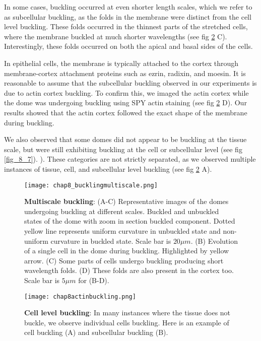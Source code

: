 In some cases, buckling occurred at even shorter length scales, which we refer to as subcellular buckling, as the folds in the membrane were distinct from the cell level buckling. These folds occurred in the thinnest parts of the stretched cells, where the membrane buckled at much shorter wavelengths (see fig \ref{fig_8_6} C). Interestingly, these folds occurred on both the apical and basal sides of the cells.

In epithelial cells, the membrane is typically attached to the cortex through membrane-cortex attachment proteins such as ezrin, radixin, and moesin. It is reasonable to assume that the subcellular buckling observed in our experiments is due to actin cortex buckling. To confirm this, we imaged the actin cortex while the dome was undergoing buckling using SPY actin staining (see fig \ref{fig_8_6} D). Our results showed that the actin cortex followed the exact shape of the membrane during buckling.

We also observed that some domes did not appear to be buckling at the tissue scale, but were still exhibiting buckling at the cell or subcellular level (see fig \ref{fig_8_7}). ). These categories are not strictly separated, as we observed multiple instances of tissue, cell, and subcellular level buckling  (see fig \ref{fig_8_6} A).

\begin{figure}
	\centering
	\texttt{[image: chap8\_bucklingmultiscale.png]}
	\caption{\label{fig_8_4} \textbf{Multiscale buckling}: (A-C) Representative images of the domes undergoing buckling at different scales. Buckled and unbuckled states of the dome with zoom in section buckled component. Dotted yellow line represents uniform curvature in unbuckled state and non-uniform curvature in buckled state. Scale bar is $20 \mu m$. (B) Evolution of a single cell in the dome during buckling. Highlighted by yellow arrow. (C) Some parts of cells undergo buckling producing short wavelength folds. (D) These  folds are also present in the cortex too. Scale bar is $5 \mu m$ for (B-D).
	}
\end{figure}

\begin{figure}[]
	\centering
	\texttt{[image: chap8actinbuckling.png]}
	\caption{\label{fig_8_6} \textbf{Cell level buckling}: In many instances where the tissue does not buckle, we observe individual cells buckling. Here is an example of cell buckling (A) and subcellular buckling (B).}
\end{figure}

